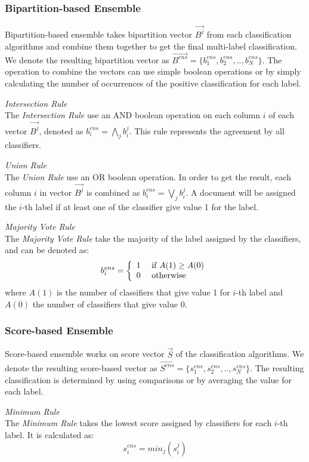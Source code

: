 \subsubsection{Bipartition-based Ensemble}
Bipartition-based ensemble takes bipartition vector $\vec{B^{j}}$ from each classification algorithms and combine them together to get the final multi-label classification. We denote the resulting bipartition vector as $\vec{B^{ens}} = \{b^{ens}_{1}, b^{ens}_{2},..,b^{ens}_{N}\}$. The operation to combine the vectors can use simple boolean operations or by simply calculating the number of occurrences of the positive classification for each label. 

\emph{Intersection Rule}\\
The \emph{Intersection Rule} use an AND boolean operation on each column $i$ of each vector $\vec{B^{j}}$, denoted as $b^{ens}_{i} = \bigwedge\limits_{j}{}b^{j}_{i}$. This rule represents the agreement by all classifiers.

\emph{Union Rule}\\
The \emph{Union Rule} use an OR boolean operation. In order to get the result, each column $i$ in vector $\vec{B^{j}}$ is combined as $b^{ens}_{i} = \bigvee\limits_{j}{}b^{j}_{i}$. A document will be assigned the $i$-th label if at least one of the classifier give value 1 for the label.

\emph{Majority Vote Rule}\\
The \emph{Majority Vote Rule} take the majority of the label assigned by the classifiers, and can be denoted as:
\[b^{ens}_{i} = \left\{
\begin{array}{cl}
1 & \textnormal{ if } A(1) \ge A(0) \\
0 & \textnormal{ otherwise}
\end{array}\right.\]
where $A(1)$ is the number of classifiers that give value 1 for $i$-th label and $A(0)$ the number of classifiers that give value 0.

\subsubsection{Score-based Ensemble}
Score-based ensemble works on score vector $\vec{S}$ of the classification algorithms. We denote the resulting score-based vector as $\vec{S^{ens}} = \{s^{ens}_{1}, s^{ens}_{2},..,s^{ens}_{N}\}$. The resulting classification is determined by using comparisons or by averaging the value for each label.

\emph{Minimum Rule}\\
The \emph{Minimum Rule} takes the lowest score assigned by classifiers for each $i$-th label. It is calculated as: 
\[s^{ens}_{i} = min_{j}(s^{j}_i)\]

